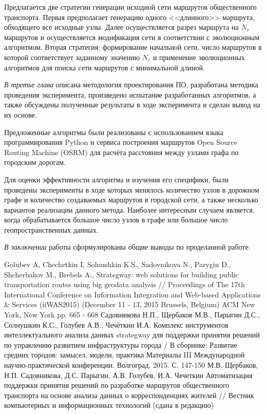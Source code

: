 Предлагается две стратегии генерации исходной сети маршрутов общественного транспорта. Первая предполагает 
генерацию одного <<длинного>> маршрута, обходящего все исходные узлы. Далее осуществляется разрез маршрута 
на \( N_r \) маршрутов и осуществляется модификация сети в соответствии с эволюционным алгоритмом. Вторая 
стратегия: формирование начальной сети, число маршрутов в которой соответствует заданному значению \( N_r \) 
и применение эволюционных алгоритмов для поиска сети маршрутов с минимальной длиной.

\emph{В третье глава} описана методология проектирования ПО, разработана методика проведения эксперимента, 
произведено испытание разработанных алгоритмов, а также обсуждены полученные результаты в ходе эксперимента 
и сделан вывод на их основе.

Предложенные алгоритмы были реализованы с использованием языка программирования Python и сервиса построения 
маршрутов Open Source Routing Machine (OSRM) для расчёта расстояния между узлами графа по городским дорогам.

Для оценки эффективности алгоритма и изучения его специфики, были проведены эксперименты в ходе которых 
менялось количество узлов в дорожном графе и количество создаваемых маршрутов в городской сети, а также 
несколько вариантов реализации данного метода. Наиболее интересным случаем является, когда обрабатывается 
большое число узлов в графе или большое число геопространственных данных.

\emph{В заключении} работы сформулированы общие выводы по проделанной работе.

\renewcommand{\bibname}{Публикации по теме магистерской}
\begin{thebibliography}{10}
     Golubev A, Chechetkin I, Solnushkin K.S., Sadovnikova N., Parygin D., Shcherbakov M., 
        Brebels A., Strategway: web solutions for building public transportation routes using big geodata 
        analysis // Proceedings of The 17th International Conference on Information Integration and 
        Web-based Applications \& Services (iiWAS2015) (December 11 - 13, 2015 Brussels, Belgium) 
        ACM New York, New York pp. 665 - 668
     Садовникова Н.П., Щербаков М.В., Парыгин Д.С., Солнушкин К.С., Голубев А.В., 
        Чечёткин И.А. Комплекс инструментов интеллектуального анализа данных strategway для поддержки 
        принятия решений по управлению развитием инфраструктуры города / В сборнике: Развитие средних 
        городов: замысел, модели, практика Материалы III Международной научно-практической конференции. 
        Волгоград, 2015. С. 147-150
     М.В. Щербаков, Н.П. Садовникова, Д.С. Парыгин, А.В. Голубев, И.А. Чечеткин 
        Автоматизация поддержки принятия решений по разработке маршрутов общественного транспорта на 
        основе анализа данных о корреспонденциях жителей // Вестник компьютерных и информационных 
        технологий (сдана в редакцию)
\end{thebibliography}
